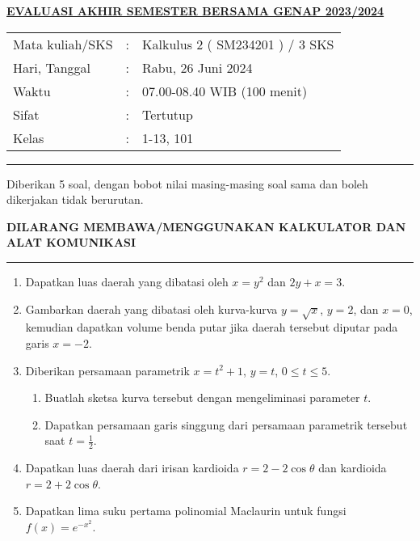 \documentclass[11pt,openany,a4paper]{article}
\begin{document}
\pagestyle{problems}
    \begin{center}
	{\underline{\textbf{\MakeUppercase{Evaluasi Akhir Semester Bersama Genap 2023/2024}}}}
    \end{center}

    \begin{center}
	\begin{tabular}{lcl}
		Mata kuliah/SKS & : & Kalkulus 2 ( SM234201 ) / 3 SKS\\
		Hari, Tanggal & : & Rabu, 26 Juni 2024\\
		Waktu & : & 07.00-08.40 WIB (100 menit)\\
		Sifat & : & Tertutup\\
		Kelas & : & 1-13, 101
	\end{tabular}
    \end{center}
	
    \noindent\rule{\textwidth}{2.pt}
	
    \setlength{\parindent}{5pt}
    \par Diberikan 5 soal, dengan bobot nilai masing-masing soal sama dan boleh dikerjakan tidak berurutan.
    \setlength{\parindent}{5pt}
    \setlength{\parindent}{5pt}
    {\small
    \par \textbf{\MakeUppercase{Dilarang membawa/menggunakan kalkulator dan alat komunikasi}}
    }
    \par {}
	
    \noindent\rule{\textwidth}{2.pt}
	
\begin{enumerate}
    \item Dapatkan luas daerah yang dibatasi oleh \( x = y^2 \) dan \( 2y + x = 3 \).

    \item Gambarkan daerah yang dibatasi oleh kurva-kurva \( y = \sqrt{x} \), \( y = 2 \), dan \( x = 0 \), kemudian dapatkan volume benda putar jika daerah tersebut diputar pada garis \( x = -2 \).

    \item Diberikan persamaan parametrik \( x = t^2 + 1 \), \( y = t \), \( 0 \leq t \leq 5 \).
    \begin{enumerate}
        \item Buatlah sketsa kurva tersebut dengan mengeliminasi parameter \( t \).
        \item Dapatkan persamaan garis singgung dari persamaan parametrik tersebut saat \( t = \frac{1}{2} \).
    \end{enumerate}

    \item Dapatkan luas daerah dari irisan kardioida \( r = 2 - 2 \cos \theta \) dan kardioida \( r = 2 + 2 \cos \theta \).

    \item Dapatkan lima suku pertama polinomial Maclaurin untuk fungsi \( f(x) = e^{-x^2} \).
\end{enumerate}
	
\end{document}
